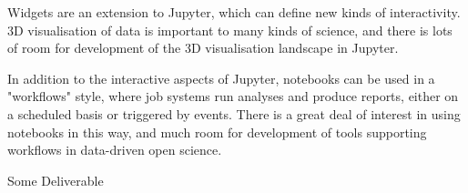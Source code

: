 \begin{workpackage}[id=ecosystem,wphases=0-48,swsites,
  title=Developing the Jupyter Ecosystem,
  short=Ecosystem,
  lead=QS,
  SRLRM=30,
  UPSUDRM=4,
  QSRM=24,
  XFELRM=54
]
\begin{wpdescription}
Widgets are an extension to Jupyter, which can define new kinds of interactivity.
3D visualisation of data is important to many kinds of science,
and there is lots of room for development of the 3D visualisation landscape in Jupyter.

In addition to the interactive aspects of Jupyter,
notebooks can be used in a "workflows" style,
where job systems run analyses and produce reports,
either on a scheduled basis or triggered by events.
There is a great deal of interest in using notebooks in this way,
and much room for development of tools supporting workflows in data-driven open science.

\end{wpdescription}

\begin{tasklist}
% 




\end{tasklist}


\begin{wpdelivs}
\begin{wpdeliv}[due=1,miles=startup,id=infrastructure,dissem=PU,nature=DEC,lead=SRL]
  {Some Deliverable}
\end{wpdeliv}

\end{wpdelivs}
\end{workpackage}


